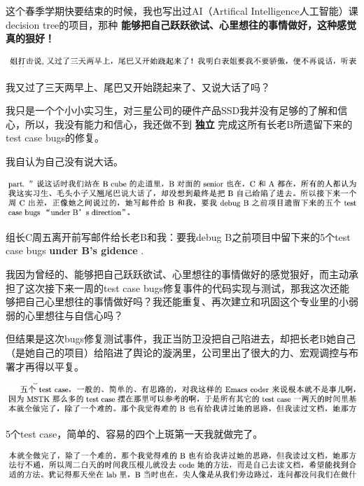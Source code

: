 \documentclass[9pt, b5paper]{article}
\begin{document}
这个春季学期快要结束的时候，我也写出过AI（Artifical Intelligence人工智能）课decision tree的项目，那种 \textbf{能够把自己跃跃欲试、心里想往的事情做好，这种感觉真的狠好！}

\begin{center}
\includegraphics[width=.9\linewidth]{./pic/backups_plans_20210507_112714.png}
\end{center}

我又过了三天两早上、尾巴又开始跷起来了、又说大话了吗？

我只是一个个小小实习生，对三星公司的硬件产品SSD我并没有足够的了解和信心，所以，我没有能力和信心，我还做不到 \textbf{独立} 完成这所有长老B所遗留下来的test case bugs的修复。

我自认为自己没有说大话。

\begin{center}
\includegraphics[width=.9\linewidth]{./pic/backups_plans_20210507_110611.png}
\end{center}

组长C周五离开前写邮件给长老B和我：要我debug B之前项目中留下来的5个test case bugs \textbf{under B's gidence} .

我因为曾经的、能够把自己跃跃欲试、心里想往的事情做好的感觉狠好，而主动承担了这次接下来一周的test case bugs修复事件的代码实现与测试，那我这次还能够把自己心里想往的事情做好吗？我还能重复、再次建立和巩固这个专业里的小弱弱的心里想往与自信心吗？

但结果是这次bugs修复测试事件，我正当防卫没把自己陷进去，却把长老B她自己（是她自己的项目）给陷进了舆论的漩涡里，公司里出了很大的力、宏观调控与布署才再得以平复。

\begin{center}
\includegraphics[width=.9\linewidth]{./pic/backups_plans_20210507_113912.png}
\end{center}

5个test case，简单的、容易的四个上斑第一天我就做完了。 

\begin{center}
\includegraphics[width=.9\linewidth]{./pic/backups_plans_20210507_114031.png}
\end{center}
\end{document}
